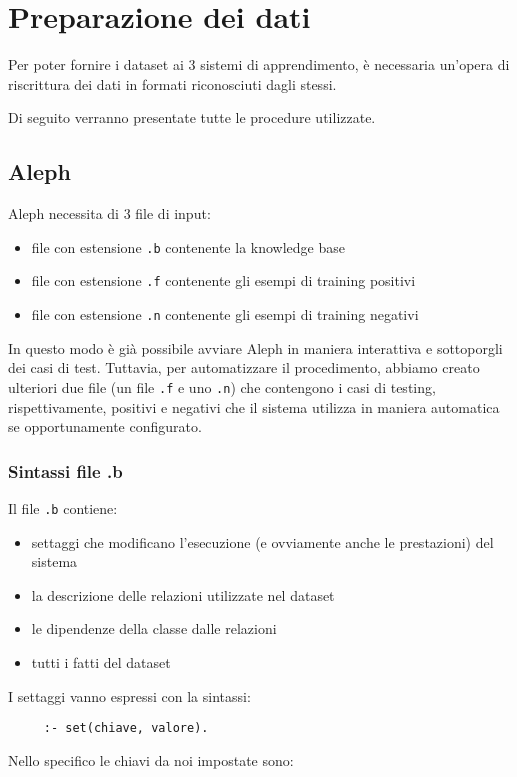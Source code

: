 \section{Preparazione dei dati}
Per poter fornire i dataset ai 3 sistemi di apprendimento, è necessaria un'opera di riscrittura dei dati in formati riconosciuti dagli stessi.

Di seguito verranno presentate tutte le procedure utilizzate.


\subsection{Aleph}
Aleph necessita di 3 file di input:
\begin{itemize}
\item file con estensione \verb+.b+ contenente la knowledge base
\item file con estensione \verb+.f+ contenente gli esempi di training positivi
\item file con estensione \verb+.n+ contenente gli esempi di training negativi
\end{itemize}

In questo modo è già possibile avviare Aleph in maniera interattiva e sottoporgli dei casi di test. Tuttavia, per automatizzare il procedimento, abbiamo creato ulteriori due file (un file \verb+.f+ e uno \verb+.n+) che contengono i casi di testing, rispettivamente, positivi e negativi che il sistema utilizza in maniera automatica se opportunamente configurato.

\subsubsection{Sintassi file .b}
Il file \verb+.b+ contiene:
\begin{itemize}
\item settaggi che modificano l'esecuzione (e ovviamente anche le prestazioni) del sistema
\item la descrizione delle relazioni utilizzate nel dataset
\item le dipendenze della classe dalle relazioni
\item tutti i fatti del dataset
\end{itemize}

I settaggi vanno espressi con la sintassi:
\begin{verbatim}
     :- set(chiave, valore).
\end{verbatim}

Nello specifico le chiavi da noi impostate sono:

